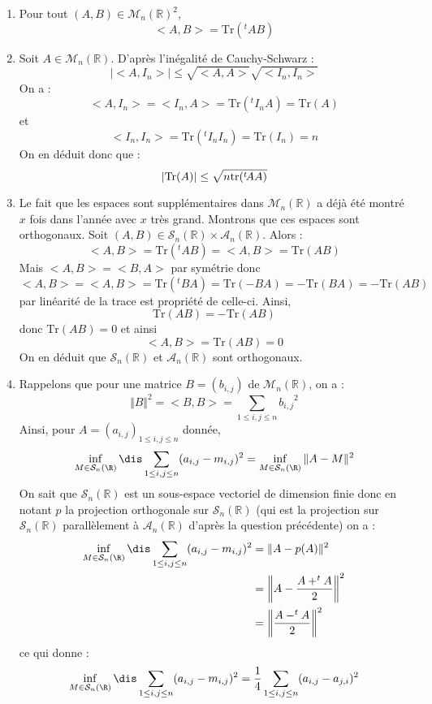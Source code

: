 \documentclass[a4paper,10pt]{report}
\begin{document}
\begin{enumerate}
\item Pour tout $(A,B) \in \mathcal{M}_n(\mathbb{R})^2$,
$$ <A,B> = \textrm{Tr}(^tAB)$$
\item Soit $A \in \mathcal{M}_n(\mathbb{R})$. D'après l'inégalité de Cauchy-Schwarz :
$$ \vert <A,I_n> \vert \leq \sqrt{<A,A>} \sqrt{<I_n,I_n>}$$
On a :
$$ <A,I_n>=<I_n,A> = \textrm{Tr}(^tI_nA) = \textrm{Tr}(A)$$
et 
$$ <I_n,I_n> = \textrm{Tr}(^tI_n I_n) = \textrm{Tr}(I_n) = n$$
On en déduit donc que :
$$ \vert\textrm{Tr}(A) \vert \leq \sqrt{n\hbox{tr}(^t\!AA)}$$
\item Le fait que les espaces sont supplémentaires dans $\mathcal{M}_n(\mathbb{R})$ a déjà été montré $x$ fois dans l'année avec $x$ très grand. Montrons que ces espaces sont orthogonaux. Soit $(A,B) \in \mathcal{S}_n(\mathbb{R}) \times \mathcal{A}_n(\mathbb{R})$. Alors :
$$ <A,B> = \textrm{Tr}(^tAB) = <A,B> = \textrm{Tr}(AB)$$
Mais $<A,B>=<B,A>$ par symétrie donc
$$ <A,B> = <A,B> = \textrm{Tr}(^tBA)  = \textrm{Tr}(-BA) =- \textrm{Tr}(BA) = - \textrm{Tr}(AB)$$
par linéarité de la trace est propriété de celle-ci. Ainsi,
$$  \textrm{Tr}(AB) =  - \textrm{Tr}(AB)$$
donc $\textrm{Tr}(AB)=0$ et ainsi 
$$ <A,B> = \textrm{Tr}(AB) = 0$$
On en déduit que $\mathcal{S}_n(\mathbb{R})$ et $\mathcal{A}_n(\mathbb{R})$ sont orthogonaux.
\item Rappelons que pour une matrice $B=(b_{i,j})$ de $\mathcal{M}_n(\mathbb{R})$, on a :
$$ \Vert B \Vert^2 = <B,B> = \sum_{1 \leq i,j \leq n} {b_{i,j}}^2$$
Ainsi, pour $A=(a_{i,j})_{1 \leq i,j \leq n}$ donn\'ee,
$$ \inf_{M\in{\cal S}_n(\R)}\dis\sum_{1 \leq i,j \leq n}(a_{i,j}-m_{i,j})^2  = \inf_{M\in{\cal S}_n(\R)} \Vert A-M \Vert^2 $$
On sait que $\mathcal{S}_n(\mathbb{R})$ est un sous-espace vectoriel de dimension finie donc en notant $p$ la projection orthogonale sur $\mathcal{S}_n(\mathbb{R})$ (qui est la projection sur $\mathcal{S}_n(\mathbb{R})$ parallèlement à $\mathcal{A}_n(\mathbb{R})$ d'après la question précédente) on a :
\begin{align*}
 \inf_{M\in{\cal S}_n(\R)}\dis\sum_{1 \leq i,j \leq n}(a_{i,j}-m_{i,j})^2 & = \Vert A-p(A) \Vert^2 \\
 & = \left\Vert A- \dfrac{A+^tA}{2} \right\Vert^2 \\
 & =  \left\Vert \dfrac{A-^tA}{2} \right\Vert^2 
 \end{align*}
 ce qui donne :
 $$  \inf_{M\in{\cal S}_n(\R)}\dis\sum_{1 \leq i,j \leq n}(a_{i,j}-m_{i,j})^2 = \dfrac{1}{4} \sum_{1 \leq i,j \leq n} (a_{i,j}-a_{j,i})^2$$
\end{enumerate}
\end{document}
